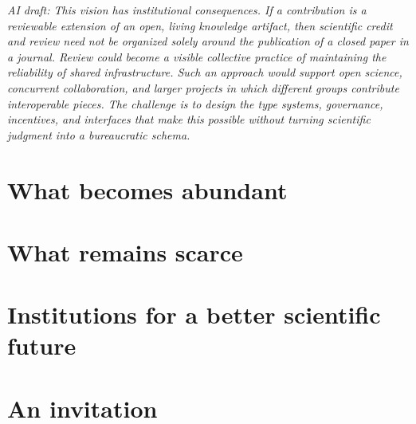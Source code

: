 \documentclass[11pt,a4paper]{article}
\newcommand{\AI}[1]{{\color{blue}\textit{AI draft: #1}}}
\begin{document}
\AI{This vision has institutional consequences.  If a contribution is a
reviewable extension of an open, living knowledge artifact, then scientific
credit and review need not be organized solely around the publication of a
closed paper in a journal.  Review could become a visible collective practice
of maintaining the reliability of shared infrastructure.  Such an approach
would support open science, concurrent collaboration, and larger projects in
which different groups contribute interoperable pieces.  The challenge is to
design the type systems, governance, incentives, and interfaces that make this
possible without turning scientific judgment into a bureaucratic schema.}

\section{What becomes abundant}


\section{What remains scarce}


\section{Institutions for a better scientific future}


\section{An invitation}

\end{document}
